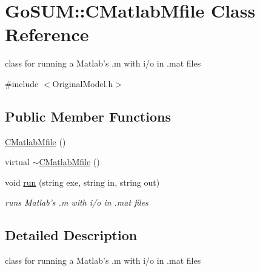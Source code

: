 \hypertarget{class_go_s_u_m_1_1_c_matlab_mfile}{\section{Go\-S\-U\-M\-:\-:C\-Matlab\-Mfile Class Reference}
\label{class_go_s_u_m_1_1_c_matlab_mfile}
}


class for running a Matlab's .m with i/o in .mat files  




{\ttfamily \#include $<$Original\-Model.\-h$>$}

\subsection*{Public Member Functions}
\begin{DoxyCompactItemize}
\item 
\hyperlink{class_go_s_u_m_1_1_c_matlab_mfile_ad4a65156fea98957c9dfcfd3e83dd633}{C\-Matlab\-Mfile} ()
\item 
virtual \hyperlink{class_go_s_u_m_1_1_c_matlab_mfile_ad1fa1185322c7ee3f533d3967f4f3a34}{$\sim$\-C\-Matlab\-Mfile} ()
\item 
void \hyperlink{class_go_s_u_m_1_1_c_matlab_mfile_a9389bf699048b5d53f5abb6b5e4ac776}{run} (string exe, string in, string out)
\begin{DoxyCompactList}\small\item\em runs Matlab's .m with i/o in .mat files \end{DoxyCompactList}\end{DoxyCompactItemize}


\subsection{Detailed Description}
class for running a Matlab's .m with i/o in .mat files 

